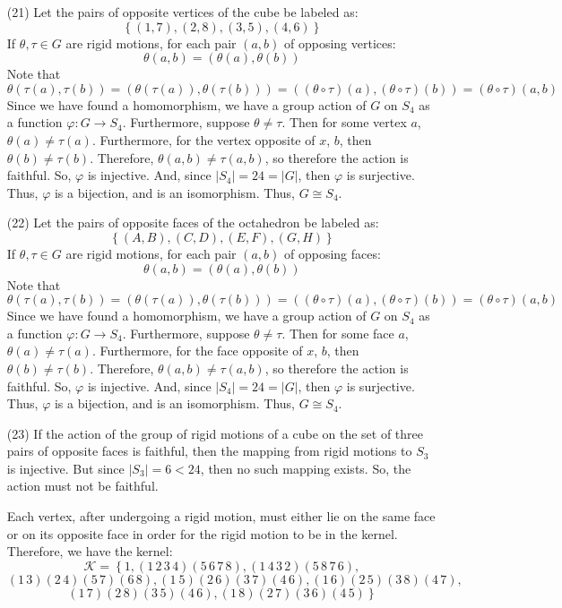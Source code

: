 \documentclass[12pt]{article}
\begin{document}
\begin{itemize}
\item[(21)]
Let the pairs of opposite vertices of the cube be labeled as:
$$\left\lbrace (1, 7), (2, 8), (3, 5), (4, 6) \right\rbrace$$
If $\theta, \tau \in G$ are rigid motions, for each pair $(a, b)$ of opposing vertices:
$$\theta(a, b) = (\theta(a), \theta(b))$$
Note that
$$\theta(\tau(a), \tau(b)) = (\theta(\tau(a)), \theta(\tau(b))) = ((\theta \circ \tau)(a), (\theta \circ \tau)(b)) = (\theta \circ \tau)(a, b)$$
Since we have found a homomorphism, we have a group action of $G$ on $S_4$ as a function $\varphi: G \rightarrow S_4$. Furthermore, suppose $\theta \neq \tau$. Then for some vertex $a$, $\theta(a) \neq \tau(a)$. Furthermore, for the vertex opposite of $x$, $b$, then $\theta(b) \neq \tau(b)$. Therefore, $\theta(a, b) \neq \tau(a, b)$, so therefore the action is faithful. So, $\varphi$ is injective. And, since $|S_4| = 24 = |G|$, then $\varphi$ is surjective. Thus, $\varphi$ is a bijection, and is an isomorphism. Thus, $G \cong S_4$.
\item[(22)]
Let the pairs of opposite faces of the octahedron be labeled as:
$$\left\lbrace (A, B), (C, D), (E, F), (G, H) \right\rbrace$$
If $\theta, \tau \in G$ are rigid motions, for each pair $(a, b)$ of opposing faces:
$$\theta(a, b) = (\theta(a), \theta(b))$$
Note that
$$\theta(\tau(a), \tau(b)) = (\theta(\tau(a)), \theta(\tau(b))) = ((\theta \circ \tau)(a), (\theta \circ \tau)(b)) = (\theta \circ \tau)(a, b)$$
Since we have found a homomorphism, we have a group action of $G$ on $S_4$ as a function $\varphi: G \rightarrow S_4$. Furthermore, suppose $\theta \neq \tau$. Then for some face $a$, $\theta(a) \neq \tau(a)$. Furthermore, for the face opposite of $x$, $b$, then $\theta(b) \neq \tau(b)$. Therefore, $\theta(a, b) \neq \tau(a, b)$, so therefore the action is faithful. So, $\varphi$ is injective. And, since $|S_4| = 24 = |G|$, then $\varphi$ is surjective. Thus, $\varphi$ is a bijection, and is an isomorphism. Thus, $G \cong S_4$.
\item[(23)]
If the action of the group of rigid motions of a cube on the set of three pairs of opposite faces is faithful, then the mapping from rigid motions to $S_3$ is injective. But since $|S_3| = 6 < 24$, then no such mapping exists. So, the action must not be faithful.

Each vertex, after undergoing a rigid motion, must either lie on the same face or on its opposite face in order for the rigid motion to be in the kernel. Therefore, we have the kernel:
$$\mathcal{K} = \left\lbrace 1, (1 \, 2 \, 3 \, 4)(5 \, 6 \, 7\, 8), (1 \, 4 \, 3 \, 2)(5 \, 8 \, 7 \, 6), \right.$$
$$\left. (1 \, 3)(2 \, 4)(5 \, 7)(6 \, 8), (1 \ 5)(2 \, 6)(3 \, 7)(4  \, 6), (1 \, 6)(2 \, 5)(3 \, 8)(4 \, 7), \right.$$
$$\left. (1 \, 7)(2 \, 8)(3 \, 5)(4 \, 6), (1 \, 8)(2 \, 7)(3 \, 6)(4 \, 5) \right\rbrace$$
\end{itemize}
\end{document}
